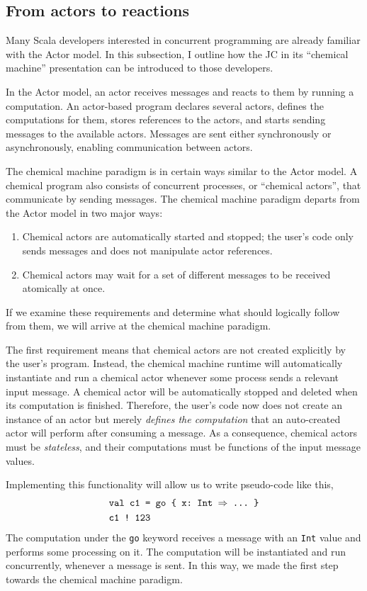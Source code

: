 \documentclass[sigplan,10pt,review,anonymous]{acmart}\settopmatter{printfolios=true}
\begin{document}
\subsection{From actors to reactions}

Many Scala developers interested in concurrent programming are already
familiar with the Actor model. In this subsection, I outline how the
JC in its ``chemical machine'' presentation can be introduced
to those developers.

In the Actor model, an actor receives messages and reacts to them
by running a computation. An actor-based program declares several
actors, defines the computations for them, stores references to the
actors, and starts sending messages to the available actors. Messages
are sent either synchronously or asynchronously, enabling communication
between actors.

The chemical machine paradigm is in certain ways similar to the Actor
model. A chemical program also consists of concurrent processes, or
``chemical actors'', that communicate by sending messages. The chemical
machine paradigm departs from the Actor model in two major ways: 
\begin{enumerate}
\item Chemical actors are automatically started and stopped; the user's
code only sends messages and does not manipulate actor references.
\item Chemical actors may wait for a set of different messages to be received
atomically at once.
\end{enumerate}
If we examine these requirements and determine what should logically
follow from them, we will arrive at the chemical machine paradigm.

The first requirement means that chemical actors are not created explicitly
by the user's program. Instead, the chemical machine runtime will
automatically instantiate and run a chemical actor whenever some process
sends a relevant input message. A chemical actor will be automatically
stopped and deleted when its computation is finished. Therefore, the
user's code now does not create an instance of an actor but merely
\emph{defines the computation} that an auto-created actor will perform
after consuming a message. As a consequence, chemical actors must
be \emph{stateless}, and their computations must be functions of the
input message values.

Implementing this functionality will allow us to write pseudo-code
like this,
\begin{align*}
\text{} & \texttt{val c1 }\text{\texttt{= go \{ x:~Int \ensuremath{\Rightarrow} ...~\}}}\\
 & \text{\texttt{c1 !~123 }}
\end{align*}
The computation under the \texttt{go} keyword receives a message with
an \texttt{Int} value and performs some processing on it. The computation
will be instantiated and run concurrently, whenever a message is sent.
In this way, we made the first step towards the chemical machine paradigm. 
\end{document}
